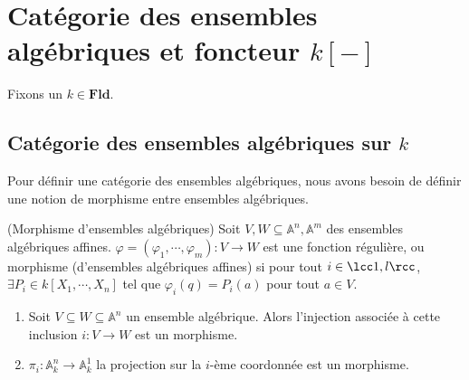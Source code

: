 \chapter{Catégorie des ensembles algébriques et foncteur $k[-]$}
    Fixons un $k \in \mathbf{Fld}$.
    \section{Catégorie des ensembles algébriques sur $k$}
        Pour définir une catégorie des ensembles algébriques, nous avons besoin de définir une notion de morphisme entre ensembles algébriques.


        \begin{defi} (Morphisme d'ensembles algébriques)
            \label{ensalgmor}
            Soit $V,W \subseteq \mathbb{A}^n, \mathbb{A}^m$ des ensembles algébriques affines. $\varphi = (\varphi_1, \cdots, \varphi_m) : V \to W$ est une fonction régulière, ou morphisme (d'ensembles algébriques affines) si pour tout $i \in \lcc 1,l \rcc$, $\exists P_i \in k[X_1, \cdots, X_n]$ tel que $\varphi_i(q) = P_i(a)$ pour tout $a \in V$.
        \end{defi}

        \begin{expl}
            \begin{enumerate}
                \item Soit $V \subseteq W \subseteq \mathbb{A}^n$ un ensemble algébrique. Alors l'injection associée à cette inclusion $i : V \to W$ est un morphisme.
                \item $\pi_i : \mathbb{A}^n_k \to \mathbb{A}_k^1$ la projection sur la $i$-ème coordonnée est un morphisme.
            \end{enumerate}
        \end{expl}

